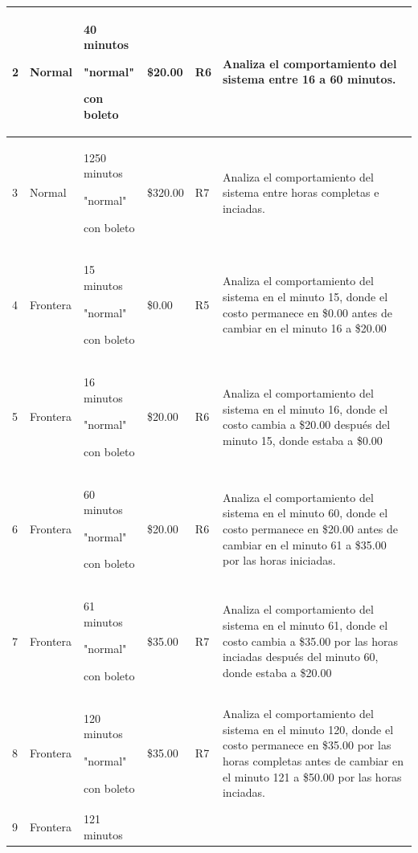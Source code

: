 \documentclass[11pt,letterpaper]{article}
\begin{document}
\begin{longtable}{
    |C{1.00cm}
    |L{1.95cm}
    |L{2.30cm}
    |L{2.00cm}
    |L{1.55cm}
    |L{4.35cm}|
}
2 &
Normal &
40 minutos

"normal"

con boleto &
\$20.00 &
R6 &
Analiza el comportamiento del sistema entre 16 a 60 minutos.
\\
\hline

3 &
Normal &
1250 minutos

"normal"

con boleto &
\$320.00 &
R7 &
Analiza el comportamiento del sistema entre horas completas e inciadas.
\\
\hline

4 &
Frontera &
15 minutos

"normal"

con boleto &
\$0.00 &
R5 &
Analiza el comportamiento del sistema en el minuto 15, donde el costo permanece en \$0.00 antes de cambiar en el minuto 16 a \$20.00
\\
\hline

5 &
Frontera &
16 minutos

"normal"

con boleto &
\$20.00 &
R6 &
Analiza el comportamiento del sistema en el minuto 16, donde el costo cambia a \$20.00 después del minuto 15, donde estaba a \$0.00
\\
\hline

6 &
Frontera &
60 minutos

"normal"

con boleto &
\$20.00 &
R6 &
Analiza el comportamiento del sistema en el minuto 60, donde el costo permanece en \$20.00 antes de cambiar en el minuto 61 a \$35.00 por las horas iniciadas.
\\
\hline

7 &
Frontera &
61 minutos

"normal"

con boleto &
\$35.00 &
R7 &
Analiza el comportamiento del sistema en el minuto 61, donde el costo cambia a \$35.00 por las horas inciadas después del minuto 60, donde estaba a \$20.00
\\
\hline

8 &
Frontera &
120 minutos

"normal"

con boleto &
\$35.00 &
R7 &
Analiza el comportamiento del sistema en el minuto 120, donde el costo permanece en \$35.00 por las horas completas antes de cambiar en el minuto 121 a \$50.00 por las horas inciadas.
\\
\hline

9 &
Frontera &
121 minutos


\end{longtable}
\end{document}
